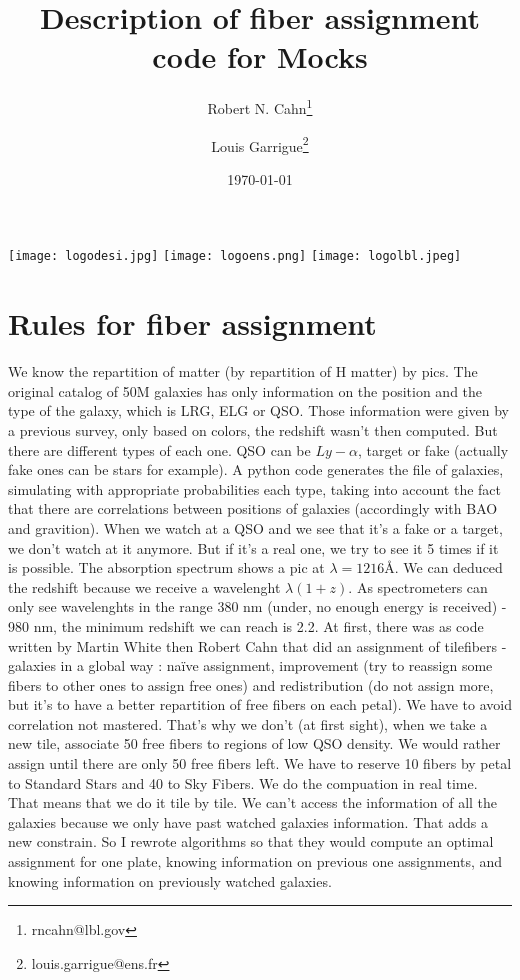 \documentclass[10pt]{extarticle}
\title{Description of fiber assignment code for Mocks}
\author[1]{Robert N. Cahn\thanks{rncahn@lbl.gov}}
\author[2]{Louis Garrigue\thanks{louis.garrigue@ens.fr}}
\affil[1]{Department of Cosmological Physics, LBNL, Berkeley}
\affil[2]{Département de physique, École normale supérieure, Paris}
\date{\today}
\begin{document}


\maketitle
\begin{center}
  \texttt{[image: logodesi.jpg]} \hfill
  \texttt{[image: logoens.png]} \hfill
  \texttt{[image: logolbl.jpeg]}
\end{center}

\section{Rules for fiber assignment}
We know the repartition of matter (by repartition of H matter) by pics.
The original catalog of 50M galaxies has only information on the position and the type of the galaxy, which is LRG, ELG or QSO. Those information were given by a previous survey, only based on colors, the redshift wasn't then computed. But there are different types of each one. QSO can be $Ly-\alpha$, target or fake (actually fake ones can be stars for example). A python code generates the file of galaxies, simulating with appropriate probabilities each type, taking into account the fact that there are correlations between positions of galaxies (accordingly with BAO and gravition). When we watch at a QSO and we see that it's a fake or a target, we don't watch at it anymore. But if it's a real one, we try to see it 5 times if it is possible.
The absorption spectrum shows a pic at $\lambda = 1216 Å$. We can deduced the redshift because we receive a wavelenght $\lambda(1+z)$. As spectrometers can only see wavelenghts in the range 380 nm (under, no enough energy is received) - 980 nm, the minimum redshift we can reach is 2.2.
At first, there was as code written by Martin White then Robert Cahn that did an assignment of tilefibers - galaxies in a global way : naïve assignment, improvement (try to reassign some fibers to other ones to assign free ones) and redistribution (do not assign more, but it's to have a better repartition of free fibers on each petal).
We have to avoid correlation not mastered. That's why we don't (at first sight), when we take a new tile, associate 50 free fibers to regions of low QSO density. We would rather assign until there are only 50 free fibers left.
We have to reserve 10 fibers by petal to Standard Stars and 40 to Sky Fibers.
We do the compuation in real time. That means that we do it tile by tile. We can't access the information of all the galaxies because we only have past watched galaxies information. That adds a new constrain. So I rewrote algorithms so that they would compute an optimal assignment for one plate, knowing information on previous one assignments, and knowing information on previously watched galaxies.
\end{document}
